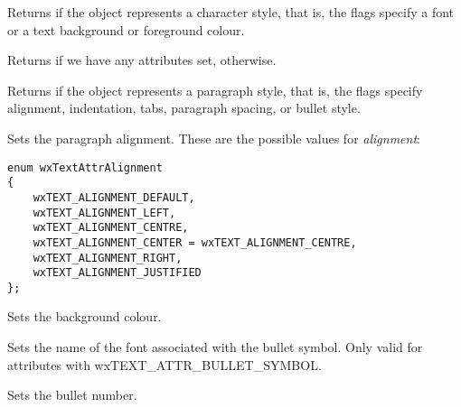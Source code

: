 Returns \true if the object represents a character style, that is,
the flags specify a font or a text background or foreground colour.

\label{wxrichtextattrisdefault}


Returns \false if we have any attributes set, \true otherwise.

\label{wxrichtextattrisparagraphstyle}


Returns \true if the object represents a paragraph style, that is,
the flags specify alignment, indentation, tabs, paragraph spacing, or
bullet style.

\label{wxrichtextattrsetalignment}


Sets the paragraph alignment. These are the possible values for {\it alignment}:

{\small
\begin{verbatim}
enum wxTextAttrAlignment
{
    wxTEXT_ALIGNMENT_DEFAULT,
    wxTEXT_ALIGNMENT_LEFT,
    wxTEXT_ALIGNMENT_CENTRE,
    wxTEXT_ALIGNMENT_CENTER = wxTEXT_ALIGNMENT_CENTRE,
    wxTEXT_ALIGNMENT_RIGHT,
    wxTEXT_ALIGNMENT_JUSTIFIED
};
\end{verbatim}
}

\label{wxrichtextattrsetbackgroundcolour}


Sets the background colour.

\label{wxrichtextattrsetbulletfont}


Sets the name of the font associated with the bullet symbol.
Only valid for attributes with wxTEXT\_ATTR\_BULLET\_SYMBOL.

\label{wxrichtextattrsetbulletnumber}


Sets the bullet number.

\label{wxrichtextattrsetbulletstyle}

